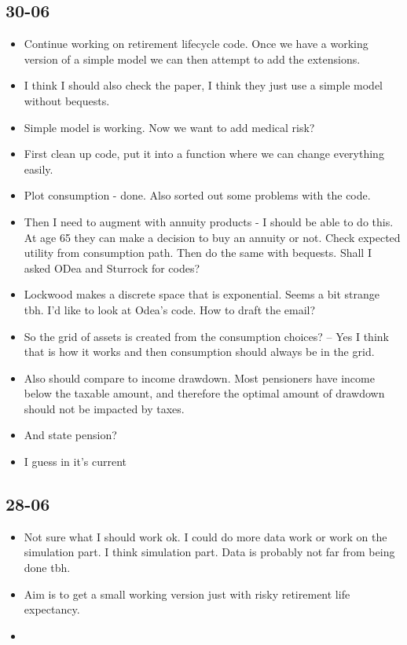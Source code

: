 \documentclass[12pt]{article}
\begin{document}
\subsection{\textbf{30-06}}
\begin{itemize}


    \item Continue working on retirement lifecycle code.
          Once we have a working version of a simple model we can then attempt
          to add the extensions.

    \item I think I should also check the \cite{odea_sturrock_rest_2023} paper,
          I think they just use a simple model without bequests.

    \item Simple model is working. Now we want to add medical risk?
    \item First clean up code, put it into a function where we can change
          everything easily.

    \item Plot consumption - done. Also sorted out some problems with the code.
    \item Then I need to augment with annuity products -
          I should be able to do this. At age 65 they can make a decision to buy an annuity or not.
          Check expected utility from consumption path.
          Then do the same with bequests.
          Shall I asked ODea and Sturrock for codes?

    \item Lockwood makes a discrete space that is exponential.
          Seems a bit strange tbh. I'd like to look at Odea's code.
          How to draft the email?

    \item So the grid of assets is created from the consumption choices?
          -- Yes I think that is how it works and then consumption should always be in the grid.


    \item Also should compare to income drawdown. Most pensioners have income
          below the taxable amount, and therefore the optimal amount of drawdown
          should not be impacted by taxes.
    \item And state pension?
    \item I guess in it's current

\end{itemize}

\subsection{\textbf{28-06}}
\begin{itemize}
    \item Not sure what I should work ok. I could do more data work or work on the simulation part.
          I think simulation part. Data is probably not far from being done tbh.

    \item Aim is to get a small working version just with risky retirement life expectancy.
    \item
\end{itemize}
\end{document}
